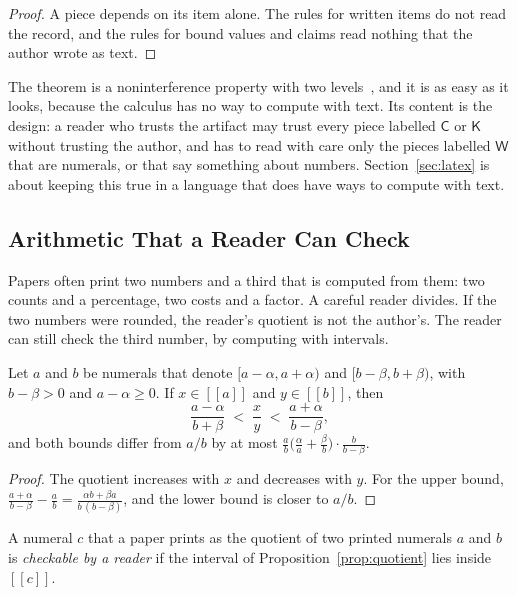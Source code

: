 \documentclass[acmsmall,nonacm,screen]{acmart}
\newcommand{\sem}[1]{[\![#1]\!]}
\newcommand{\lW}{\mathsf{W}}
\newcommand{\lC}{\mathsf{C}}
\newcommand{\lK}{\mathsf{K}}
\begin{document}
\begin{proof}
A piece depends on its item alone. The rules for written items do not read the record, and
the rules for bound values and claims read nothing that the author wrote as text.
\end{proof}

The theorem is a noninterference property with two levels~\citep{volpano1996}, and it is as
easy as it looks, because the calculus has no way to compute with text. Its content is the
design: a reader who trusts the artifact may trust every piece labelled $\lC$ or $\lK$ without
trusting the author, and has to read with care only the pieces labelled $\lW$ that are
numerals, or that say something about numbers. Section~\ref{sec:latex} is about keeping this
true in a language that does have ways to compute with text.

\subsection{Arithmetic That a Reader Can Check}

Papers often print two numbers and a third that is computed from them: two counts and a
percentage, two costs and a factor. A careful reader divides. If the two numbers were
rounded, the reader's quotient is not the author's. The reader can still check the third
number, by computing with intervals.

\begin{proposition}[Quotients]
\label{prop:quotient}
Let $a$ and $b$ be numerals that denote $[a - \alpha, a + \alpha)$ and
$[b - \beta, b + \beta)$, with $b - \beta > 0$ and $a - \alpha \ge 0$. If $x \in \sem{a}$
and $y \in \sem{b}$, then
\[
\frac{a - \alpha}{b + \beta} \;<\; \frac{x}{y} \;<\; \frac{a + \alpha}{b - \beta},
\]
and both bounds differ from $a / b$ by at most
$\frac{a}{b} \bigl(\frac{\alpha}{a} + \frac{\beta}{b}\bigr) \cdot \frac{b}{b - \beta}$.
\end{proposition}

\begin{proof}
The quotient increases with $x$ and decreases with $y$. For the upper bound,
$\frac{a + \alpha}{b - \beta} - \frac{a}{b} = \frac{\alpha b + \beta a}{b\,(b - \beta)}$, and
the lower bound is closer to $a / b$.
\end{proof}

\begin{definition}
A numeral $c$ that a paper prints as the quotient of two printed numerals $a$ and $b$ is
\emph{checkable by a reader} if the interval of Proposition~\ref{prop:quotient} lies inside
$\sem{c}$.
\end{definition}
\end{document}
